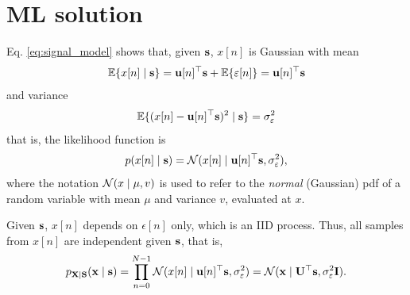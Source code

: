 

\section{ML solution}

Eq. \eqref{eq:signal_model} shows that, given ${\mathbf s}$, $x[n]$ is Gaussian with mean
\begin{align}
\mathbb{E}\{x[n] \mid {\mathbf s} \} = {\mathbf u}[n]^\top {\mathbf s} + \mathbb{E}\{\varepsilon[n]\} = {\mathbf u}[n]^\top {\mathbf s} 
\end{align}
and variance
\begin{align}
\mathbb{E}\{(x[n]-{\mathbf u}[n]^\top {\mathbf s})^2 \mid{\mathbf s} \} = \sigma_\varepsilon^2 
\end{align}
that is, the likelihood function is
\begin{equation}
p(x[n] \mid {\mathbf s} ) = {\mathcal N}(x[n] \mid {\mathbf u}[n]^\top{\mathbf s}, \sigma_\varepsilon^2),
\end{equation}
where the notation ${\mathcal N}(x \mid \mu, v) $ is used to refer to the \emph{normal} (Gaussian) pdf of a random variable with mean $\mu$ and variance $v$, evaluated at $x$.

Given ${\mathbf s}$, $x[n]$ depends on $\epsilon[n]$ only, which is an IID process. Thus, all samples from $x[n]$ are independent given ${\mathbf s}$, that is,
\begin{equation}
p_{{\bf X}|{\bf S}}({\mathbf x} \mid {\mathbf s}) = \prod_{n=0}^{N-1} {\mathcal N}(x[n] \mid {\mathbf u}[n]^\top{\mathbf s}, \sigma_\varepsilon^2) 
           = {\mathcal N}({\mathbf x} \mid {\mathbf U}^\top{\mathbf s}, \sigma_\varepsilon^2{\mathbf I}).
\end{equation}

